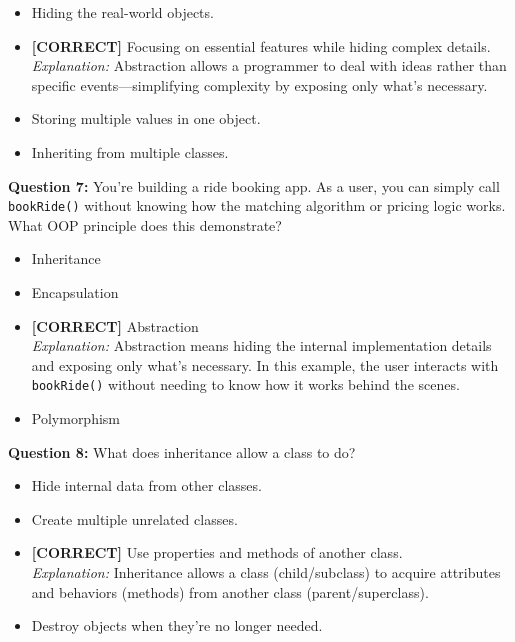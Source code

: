 \begin{itemize}
 \item Hiding the real-world objects.
 \item \textbf{[CORRECT]} Focusing on essential features while hiding complex details.
\\[0.1cm]
\textit{Explanation:} 
Abstraction allows a programmer to deal with ideas rather than specific events---simplifying complexity by exposing only what's necessary.
 \item Storing multiple values in one object.
 \item Inheriting from multiple classes.
\end{itemize}
\vspace{0.3cm}
\noindent
\textbf{Question 7:} You're building a ride booking app. As a user, you can simply call \texttt{bookRide()} without knowing how the matching algorithm or pricing logic works.
\\
What OOP principle does this demonstrate?
\\[0.2cm]
\begin{itemize}
 \item Inheritance
 \item Encapsulation
 \item \textbf{[CORRECT]} Abstraction
\\[0.1cm]
\textit{Explanation:} 
Abstraction means hiding the internal implementation details and exposing only what's necessary. In this example, the user interacts with \texttt{bookRide()} without needing to know how it works behind the scenes.
 \item Polymorphism
\end{itemize}
\vspace{0.3cm}
\noindent
\textbf{Question 8:} What does inheritance allow a class to do?
\\[0.2cm]
\begin{itemize}
 \item Hide internal data from other classes.
 \item Create multiple unrelated classes.
 \item \textbf{[CORRECT]} Use properties and methods of another class.
\\[0.1cm]
\textit{Explanation:} 
Inheritance allows a class (child/subclass) to acquire attributes and behaviors (methods) from another class (parent/superclass).
 \item Destroy objects when they're no longer needed.
\end{itemize}
\vspace{0.3cm}
